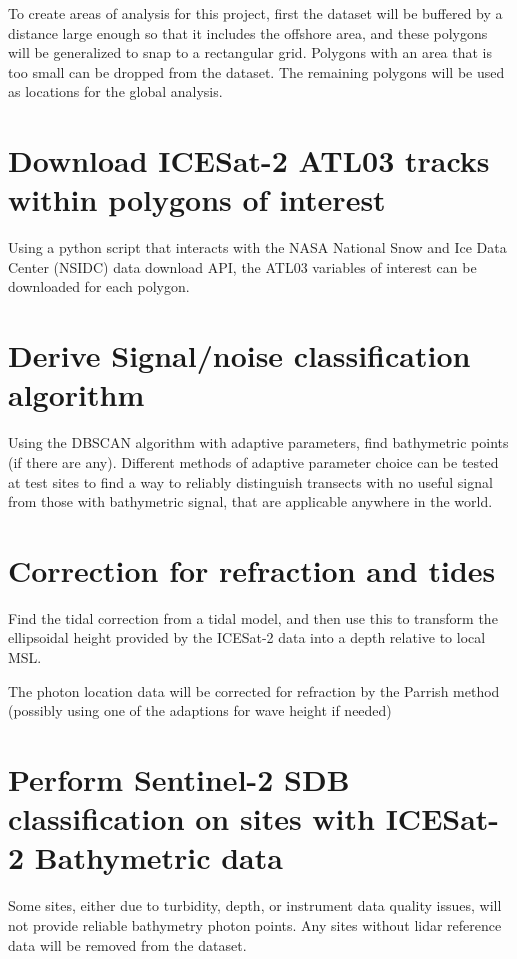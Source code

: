 To create areas of analysis for this project, first the \citeauthor{Giri2011b} dataset will be buffered by a distance large enough so that it includes the offshore area, and these polygons will be generalized to snap to a rectangular grid. Polygons with an area that is too small can be dropped from the dataset. The remaining polygons will be used as locations for the global analysis.

\section{Download ICESat-2 ATL03 tracks within polygons of interest}
Using a python script that interacts with the NASA National Snow and Ice Data Center (NSIDC) data download API, the ATL03 variables of interest can be downloaded for each polygon.

\section{Derive Signal/noise classification algorithm}
Using the DBSCAN algorithm with adaptive parameters, find bathymetric points (if there are any). Different methods of adaptive parameter choice can be tested at test sites to find a way to reliably distinguish transects with no useful signal from those with bathymetric signal, that are applicable anywhere in the world.

\section{Correction for refraction and tides}

Find the tidal correction from a tidal model, and then use this to transform the ellipsoidal height provided by the ICESat-2 data into a depth relative to local MSL.

The photon location data will be corrected for refraction by the Parrish method (possibly using one of the adaptions for wave height if needed)

\section{Perform Sentinel-2 SDB classification on sites with ICESat-2 Bathymetric data}
Some sites, either due to turbidity, depth, or instrument data quality issues, will not provide reliable bathymetry photon points. Any sites without lidar reference data will be removed from the dataset.

